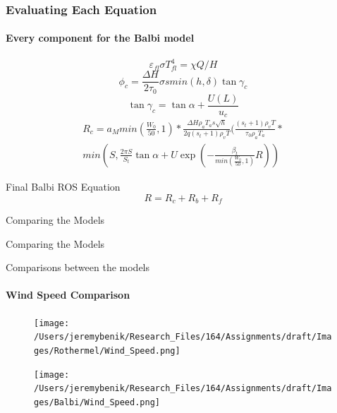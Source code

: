 \documentclass{beamer}
\begin{document}
\begin{frame}
	\frametitle{Evaluating Each Equation}
	\framesubtitle{Every component for the Balbi model}
	\begin{equation}
	\varepsilon_{fl} \sigma T^{4}_{fl} = \chi Q / H \label{high speed regimes 2007}
	\end{equation}
	\begin{equation}
	\phi _ c = \frac {\Delta H} {2 \tau _ 0} \sigma s min(h, \delta) \tan \gamma _ c \label{convection intro}
	\end{equation}
	\begin{equation}
	\tan \gamma _ {c} = \tan \alpha + \frac {U(L)} {u_{c}}
	\end{equation}
\begin{equation}
	\label{convective component}
	\begin{split}
	R_c = a_M min(\frac {W_0}{50}, 1)* \frac {\Delta H \rho _ a T_a s \sqrt{h}}{2q(s_t + 1) \rho _ v T} (\frac {(s_t + 1) \rho _ v T}{\tau _ 0 \rho _ a T_a} * \\ min(S, \frac {2 \pi S}{S_t} \tan \alpha + U \exp (- \frac {\beta _ t}{min(\frac{W_0}{50}, 1)} R))
	\end{split}
\end{equation}
\end{frame}

\begin{frame} {Final Balbi ROS Equation}
	\begin{equation}
	R = R_c + R_b + R_f
	\label{Balbi ROS equation}
	\end{equation}
\end{frame}


\begin{frame} {Comparing the Models}
\begin{center}
{\fontsize{40}{50}\selectfont Comparing the Models}
\end{center}
\end{frame}

\begin{frame} {Comparisons between the models}
\framesubtitle{Wind Speed Comparison}
\begin{figure}
\centering
\begin{minipage}{.5\textwidth}
  \centering
  \texttt{[image: /Users/jeremybenik/Research\_Files/164/Assignments/draft/Images/Rothermel/Wind\_Speed.png]}
  \label{fig:test1}
\end{minipage}%
\begin{minipage}{.5\textwidth}
  \centering
  \texttt{[image: /Users/jeremybenik/Research\_Files/164/Assignments/draft/Images/Balbi/Wind\_Speed.png]}
  \label{fig:test2}
\end{minipage}
\end{figure}
\end{frame}
\end{document}
